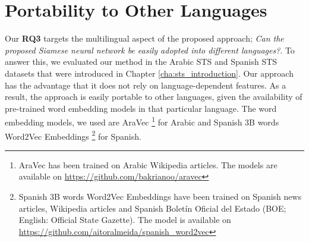 \section{Portability to Other Languages}
\label{sec:siamese_languages}
Our \textbf{RQ3} targets the multilingual aspect of the proposed approach; \textit{Can the proposed Siamese neural network be easily adopted into different languages?}. To answer this, we evaluated our method in the Arabic STS and Spanish STS datasets that were introduced in Chapter \ref{cha:sts_introduction}. Our approach has the advantage that it does not rely on language-dependent features.  As a result, the approach is easily portable to other languages, given the availability of pre-trained word embedding models in that particular language. The word embedding models, we used are AraVec \autocite{SOLIMAN2017256} \footnote{AraVec has been trained on Arabic Wikipedia articles. The models are available on \url{https://github.com/bakrianoo/aravec}} for Arabic and Spanish 3B words Word2Vec Embeddings \autocite{doi:10.1177/1550147718811827}\footnote{Spanish 3B words Word2Vec Embeddings have been trained on Spanish news articles, Wikipedia articles and Spanish Boletín Oficial del Estado (BOE; English: Official State Gazette). The model is available on \url{https://github.com/aitoralmeida/spanish_word2vec}} for Spanish.


\begin{table}[htb]
	\centering
	\caption[Results for Arabic STS with Siamese Neural Network]{Results for Arabic STS dataset with different variants of Siamese Neural Network. For each variant, Pearson Correlation ($\bm{\rho}$) and Spearman Correlation ($\bm{\tau}$) are reported between the predicted values and the gold labels of the test set. The best result from all the variations is marked with ${\dagger}$. }  
	\label{tab:arabic_siamese}
\end{table}


